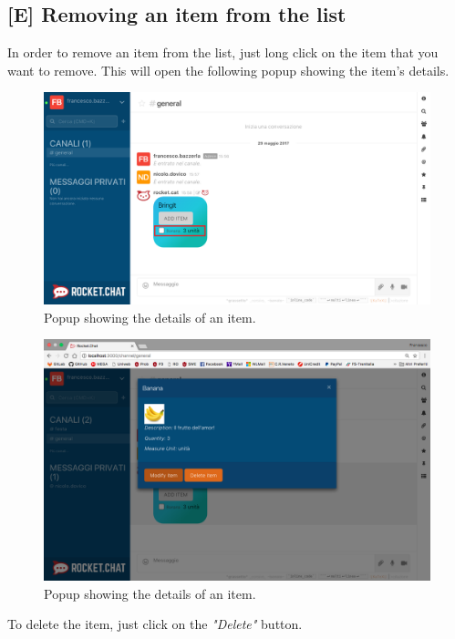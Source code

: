 \newpage
\subsection{[E] Removing an item from the list}
In order to remove an item from the list, just long click on the item that you want to remove. This will open the following popup showing the item's details.

\begin{figure}[H]
  \centering 
  \includegraphics[width=\textwidth]{Sections/3-HowToUse/Images/bubble_item_to_delete.png}
  \caption{Popup showing the details of an item.}
\end{figure}

\begin{figure}[H]
  \centering 
  \includegraphics[width=\textwidth]{Sections/3-HowToUse/Images/item_details.png}
  \caption{Popup showing the details of an item.}
\end{figure}

To delete the item, just click on the \textit{"Delete"} button.

